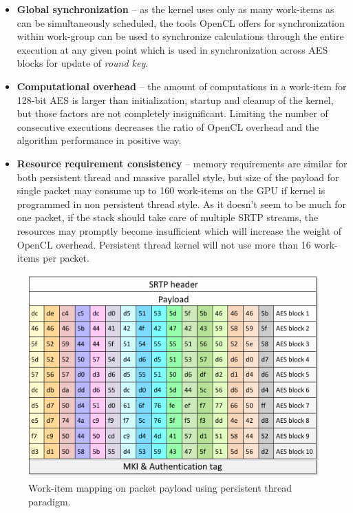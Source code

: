 \begin{itemize}
\item \textbf{Global synchronization} -- as the kernel uses only as many 
work-items as can be simultaneously scheduled, the tools OpenCL offers
for synchronization within work-group can be used to synchronize calculations
through the entire execution at any given point which is used in 
synchronization across AES blocks for update of \textit{round key}.
\item \textbf{Computational overhead} -- the amount of computations in a 
work-item for 128-bit AES is larger than initialization, startup and cleanup
of the kernel, but those factors are not completely insignificant. Limiting
the number of consecutive executions decreases the ratio of OpenCL overhead and
the algorithm performance in positive way.
\item \textbf{Resource requirement consistency} -- memory requirements are
similar for both persistent thread and massive parallel style, but size of the 
payload for single packet may consume up to 160 work-items on the GPU if kernel
is programmed in non persistent thread style. As it doesn't seem to be much for
one packet, if the stack should take care of multiple SRTP streams, the 
resources may promptly become insufficient which will increase the weight of 
OpenCL overhead. Persistent thread kernel will not use more than 16 work-items
per packet.
\end{itemize}

\begin{figure}[H]
\centering
\includegraphics[width=13cm]{fig/packet_wi.pdf}
\caption[Persistent thread work-item mapping]{Work-item mapping on packet 
payload using persistent thread paradigm.}
\label{pt_payload}
\end{figure}


